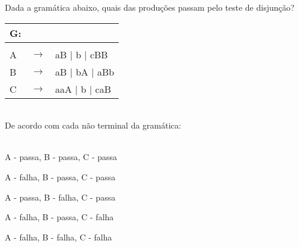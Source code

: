 \question[10] 

Dada a gramática abaixo, quais das produções passam pelo teste de disjunção?\\
\begin{tabular}{|l c l}
	G: & & \\
	\hline \\
	A & $\rightarrow$ & aB | b | cBB \\
    B & $\rightarrow$ & aB | bA | aBb \\
	C & $\rightarrow$ & aaA | b | caB \\
\end{tabular}
\\
De acordo com cada não terminal da gramática:\\
\\
\begin{choices}
\item A - passa, B - passa, C - passa
\item A - falha, B - passa, C - passa
\item A - passa, B - falha, C - passa %
\item A - falha, B - passa, C - falha
\item A - falha, B - falha, C - falha
\end{choices}
\answerline

